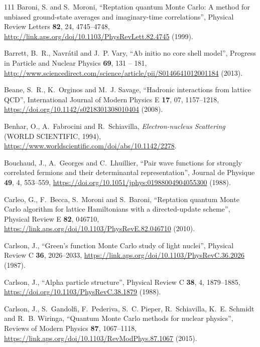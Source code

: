 \documentclass[12pt,letterpaper,UTF8]{report}
\begin{document}
{\begin{thebibliography}{111}
Baroni, S. and S.~Moroni, \enquote{Reptation quantum {Monte} {Carlo}: A method
  for unbiased ground-state averages and imaginary-time correlations}, Physical
  Review Letters \textbf{82}, 24, 4745--4748,
  \urlprefix\url{http://link.aps.org/doi/10.1103/PhysRevLett.82.4745} (1999).

Barrett, B.~R., Navr{\'{a}}til and J.~P. Vary, \enquote{Ab initio no core shell
  model}, Progress in Particle and Nuclear Physics \textbf{69}, 131 -- 181,
  \urlprefix\url{http://www.sciencedirect.com/science/article/pii/S0146641012001184}
  (2013).

Beane, S.~R., K.~Orginos and M.~J. Savage, \enquote{Hadronic interactions from
  lattice {QCD}}, International Journal of Modern Physics E \textbf{17}, 07,
  1157--1218, \urlprefix\url{https://doi.org/10.1142/s0218301308010404} (2008).

Benhar, O., A.~Fabrocini and R.~Schiavilla, \emph{Electron-nucleus Scattering}
  (WORLD SCIENTIFIC, 1994),
  \urlprefix\url{https://www.worldscientific.com/doi/abs/10.1142/2278}.

Bouchaud, J., A.~Georges and C.~Lhuillier, \enquote{Pair wave functions for
  strongly correlated fermions and their determinantal representation}, Journal
  de Physique \textbf{49}, 4, 553--559,
  \urlprefix\url{https://doi.org/10.1051/jphys:01988004904055300} (1988).

Carleo, G., F.~Becca, S.~Moroni and S.~Baroni, \enquote{Reptation quantum
  {Monte} {Carlo} algorithm for lattice {Hamiltonians} with a directed-update
  scheme}, Physical Review E \textbf{82}, 046710,
  \urlprefix\url{https://link.aps.org/doi/10.1103/PhysRevE.82.046710} (2010).

Carlson, J., \enquote{{Green}'s function {Monte} {Carlo} study of light
  nuclei}, Physical Review C \textbf{36}, 2026--2033,
  \urlprefix\url{https://link.aps.org/doi/10.1103/PhysRevC.36.2026} (1987).

Carlson, J., \enquote{Alpha particle structure}, Physical Review C \textbf{38},
  4, 1879--1885, \urlprefix\url{https://doi.org/10.1103/PhysRevC.38.1879}
  (1988).

Carlson, J., S.~Gandolfi, F.~Pederiva, S.~C. Pieper, R.~Schiavilla, K.~E.
  Schmidt and R.~B. Wiringa, \enquote{Quantum {Monte} {Carlo} methods for
  nuclear physics}, Reviews of Modern Physics \textbf{87}, 1067--1118,
  \urlprefix\url{https://link.aps.org/doi/10.1103/RevModPhys.87.1067} (2015).


\end{thebibliography}}
\end{document}

